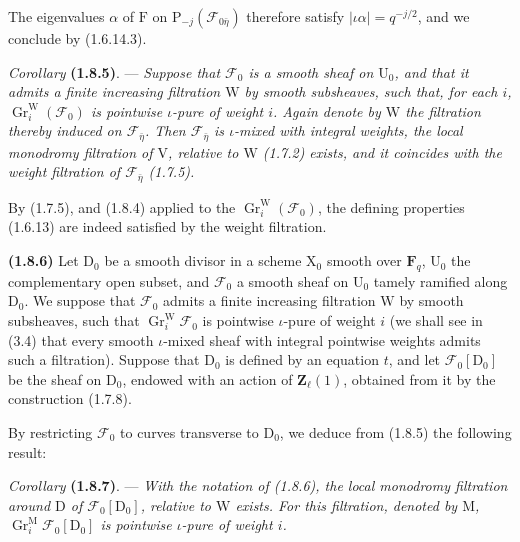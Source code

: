 \documentclass[11pt,leqno]{article}
\begin{document}
The eigenvalues \(\alpha\) of \(\mathrm{F}\) on \(\mathrm{P}_{-j}(\mathscr{F}_{0\bar{\eta}})\) therefore satisfy \(|\iota\alpha|=q^{-j/2}\), and we conclude by (1.6.14.3).

\textit{Corollary} \textbf{(1.8.5)}. — \textit{Suppose that \(\mathscr{F}_0\) is a smooth sheaf on \(\mathrm{U}_0\), and that it admits a finite increasing filtration \(\mathrm{W}\) by smooth subsheaves, such that, for each \(i\), \(\operatorname{Gr}_i^{\mathrm{W}}(\mathscr{F}_0)\) is pointwise \(\iota\)-pure of weight \(i\). Again denote by \(\mathrm{W}\) the filtration thereby induced on \(\mathscr{F}_{\bar{\eta}}\). Then \(\mathscr{F}_{\bar{\eta}}\) is \(\iota\)-mixed with integral weights, the local monodromy filtration of \(\mathrm{V}\), relative to \(\mathrm{W}\) \textup{(1.7.2)} exists, and it coincides with the weight filtration of \(\mathscr{F}_{\bar{\eta}}\) \textup{(1.7.5)}.}

By (1.7.5), and (1.8.4) applied to the \(\operatorname{Gr}_i^{\mathrm{W}}(\mathscr{F}_0)\), the defining properties (1.6.13) are indeed satisfied by the weight filtration.

\textbf{(1.8.6)} Let \(\mathrm{D}_0\) be a smooth divisor in a scheme \(\mathrm{X}_0\) smooth over \(\mathbf{F}_q\), \(\mathrm{U}_0\) the complementary open subset, and \(\mathscr{F}_0\) a smooth sheaf on \(\mathrm{U}_0\) tamely ramified along \(\mathrm{D}_0\). We suppose that \(\mathscr{F}_0\) admits a finite increasing filtration \(\mathrm{W}\) by smooth subsheaves, such that \(\operatorname{Gr}_i^{\mathrm{W}}\mathscr{F}_0\) is pointwise \(\iota\)-pure of weight \(i\) (we shall see in (3.4) that every smooth \(\iota\)-mixed sheaf with integral pointwise weights admits such a filtration). Suppose that \(\mathrm{D}_0\) is defined by an equation \(t\), and let \(\mathscr{F}_0[\mathrm{D}_0]\) be the sheaf on \(\mathrm{D}_0\), endowed with an action of \(\mathbf{Z}_\ell(1)\), obtained from it by the construction (1.7.8).

By restricting \(\mathscr{F}_0\) to curves transverse to \(\mathrm{D}_0\), we deduce from (1.8.5) the following result:

\textit{Corollary} \textbf{(1.8.7)}. — \textit{With the notation of \textup{(1.8.6)}, the local monodromy filtration around \(\mathrm{D}\) of \(\mathscr{F}_0[\mathrm{D}_0]\), relative to \(\mathrm{W}\) exists. For this filtration, denoted by \(\mathrm{M}\), \(\operatorname{Gr}_i^{\mathrm{M}}\mathscr{F}_0[\mathrm{D}_0]\) is pointwise \(\iota\)-pure of weight \(i\).}
\end{document}
